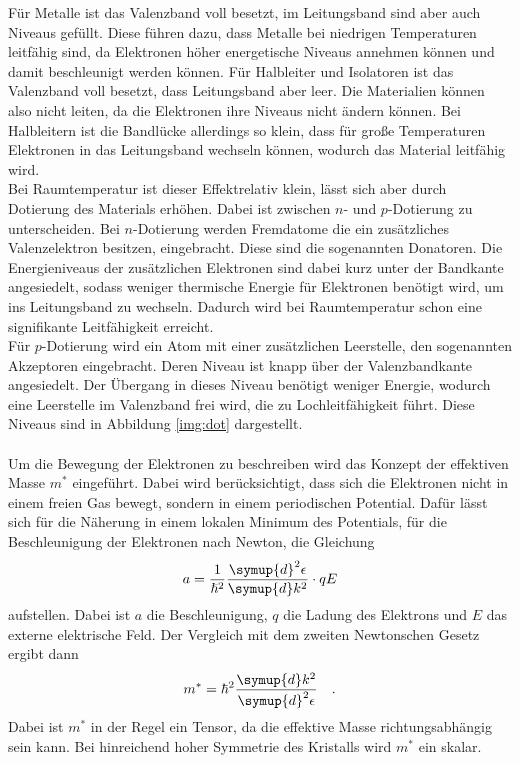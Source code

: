 \noindent
Für Metalle ist das Valenzband voll besetzt, im Leitungsband sind aber auch Niveaus gefüllt. 
Diese führen dazu, dass Metalle bei niedrigen Temperaturen leitfähig sind, da Elektronen höher energetische Niveaus annehmen können und damit beschleunigt werden können.
Für Halbleiter und Isolatoren ist das Valenzband voll besetzt, dass Leitungsband aber leer. Die Materialien können also nicht leiten, da die Elektronen ihre Niveaus nicht ändern können.
Bei Halbleitern ist die Bandlücke allerdings so klein, dass für große Temperaturen Elektronen in das Leitungsband wechseln können, wodurch das Material leitfähig wird.\\
Bei Raumtemperatur ist dieser Effektrelativ klein, lässt sich aber durch Dotierung des Materials erhöhen. Dabei ist zwischen $n$- und $p$-Dotierung zu unterscheiden.
Bei $n$-Dotierung werden Fremdatome die ein zusätzliches Valenzelektron besitzen, eingebracht. Diese sind die sogenannten Donatoren. 
Die Energieniveaus der zusätzlichen Elektronen sind dabei kurz unter der Bandkante angesiedelt, sodass weniger thermische Energie für Elektronen benötigt wird, 
um ins Leitungsband zu wechseln.
Dadurch wird bei Raumtemperatur schon eine signifikante Leitfähigkeit erreicht.\\
Für $p$-Dotierung wird ein Atom mit einer zusätzlichen Leerstelle, den sogenannten Akzeptoren eingebracht.
Deren Niveau ist knapp über der Valenzbandkante angesiedelt. 
Der Übergang in dieses Niveau benötigt weniger Energie, wodurch eine Leerstelle im Valenzband frei wird, die zu Lochleitfähigkeit führt.
Diese Niveaus sind in Abbildung \ref{img:dot} dargestellt. \\\\



\noindent
Um die Bewegung der Elektronen zu beschreiben wird das Konzept der effektiven Masse $m^*$ eingeführt. 
Dabei wird berücksichtigt, dass sich die Elektronen nicht in einem freien Gas bewegt, sondern in einem periodischen Potential. 
Dafür lässt sich für die Näherung in einem lokalen Minimum des Potentials, für die Beschleunigung der Elektronen nach Newton, die Gleichung
\begin{equation*}
    a = \frac{1}{\hslash^2}\frac{\symup{d}^2\epsilon}{\symup{d}k^2} \cdot qE 
\end{equation*} 
aufstellen. Dabei ist $a$ die Beschleunigung, $q$ die Ladung des Elektrons und $E$ das externe elektrische Feld.
Der Vergleich mit dem zweiten Newtonschen Gesetz ergibt dann
\begin{equation*}
    m^* =  \hbar^2 \frac{\symup{d}k^2}{\symup{d}^2\epsilon}\quad.
\end{equation*} 
Dabei ist $m^*$ in der Regel ein Tensor, da die effektive Masse richtungsabhängig sein kann.
Bei hinreichend hoher Symmetrie des Kristalls wird $m^*$ ein skalar. 



